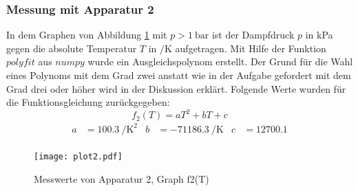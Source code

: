 \newpage

 \subsubsection{Messung mit Apparatur 2}
\label{sec: MmA2}
In dem Graphen von Abbildung \ref{fig:f2(T)} mit $p > \SI{1}{\bar}$ ist der
Dampfdruck
$p$ in \si{\kPa} gegen die absolute Temperatur $T$ in $\si{\per\kelvin}$
aufgetragen. Mit Hilfe der Funktion $polyfit$ aus $numpy$ wurde ein
Ausgleichspolynom erstellt. Der Grund für die Wahl eines
Polynoms mit dem Grad zwei anstatt wie in der Aufgabe gefordert mit dem Grad
drei oder höher wird in der Diskussion erklärt.
Folgende Werte wurden für die Funktionsgleichung zurückgegeben:
\begin{equation}
  f_2(T) = aT^2 + bT + c
\end{equation}
\begin{align}
  a & = \SI{100.3}{\per\kelvin\tothe{2}} & b & =
  \SI{-71186.3}{\per\kelvin} & c & = 12700.1 \\
\end{align}

\begin{figure}[h]
  \centering
  \texttt{[image: plot2.pdf]}
  \caption{Messwerte von Apparatur 2, Graph f2(T)}
  \label{fig:f2(T)}
\end{figure}

